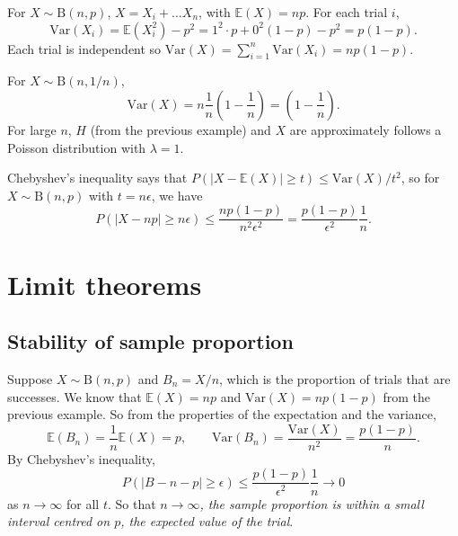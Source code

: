\documentclass[letter-paper]{tufte-book}
\newenvironment{example}[1][Example]{\begin{trivlist}
\item[\hskip \labelsep {\bfseries #1}]}{\end{trivlist}}
\begin{document}
\begin{example}
  For $X\sim\mbox{B}(n,p)$, $X = X_i + \ldots X_n$, with $\mathbb{E}(X) = np$.
  For each trial $i$,
  \begin{equation*}
    \mbox{Var}(X_i) = \mathbb{E}(X_i^2) - p^2 =
    1^2\cdot p + 0^2(1-p) - p^2 = p(1-p).
  \end{equation*}
  Each trial is independent so $\mbox{Var}(X) = \sum_{i=1}^n \mbox{Var}(X_i) =
  np(1-p)$.
  
  For $X\sim\mbox{B}(n,1/n)$,
  \begin{equation*}
    \mbox{Var}(X) = n\frac{1}{n}\left(1-\frac{1}{n}\right) = 
    \left(1-\frac{1}{n}\right).
  \end{equation*}
  For large $n$, $H$ (from the previous example) and $X$ are approximately
  follows a Poisson distribution with $\lambda = 1$.
  
  Chebyshev's inequality says that $P(|X-\mathbb{E}(X)| \geq t) \leq
  \mbox{Var}(X) / t^2$, so for $X\sim\mbox{B}(n,p)$ with $t=n\epsilon$, we have
  \begin{equation*}
    P(|X - np| \geq n\epsilon) \leq \frac{np(1-p)}{n^2\epsilon^2}
    = \frac{p(1-p)}{\epsilon^2}\frac{1}{n}.
  \end{equation*}
\end{example}



\section{Limit theorems}


\subsection{Stability of sample proportion}

Suppose $X\sim\mbox{B}(n,p)$ and $B_n = X/n$, which is the proportion of trials
that are successes. We know that $\mathbb{E}(X) = np$ and $\mbox{Var}(X) =
np(1-p)$ from the previous example. So from the properties of the expectation
and the variance,
\begin{equation*}
  \mathbb{E}(B_n) = \frac{1}{n}\mathbb{E}(X) = p,\qquad
  \mbox{Var}(B_n) = \frac{\mbox{Var}(X)}{n^2} = \frac{p(1-p)}{n}.
\end{equation*}
By Chebyshev's inequality,
\begin{equation*}
  P(|B-n - p| \geq \epsilon) \leq \frac{p(1-p)}{\epsilon^2} \frac{1}{n}
  \to 0
\end{equation*}
as $n\to\infty$ for all $t$. So that \emph{$n\to\infty$, the sample
proportion is within a small interval centred on $p$, the expected value of the
trial}.
\end{document}

